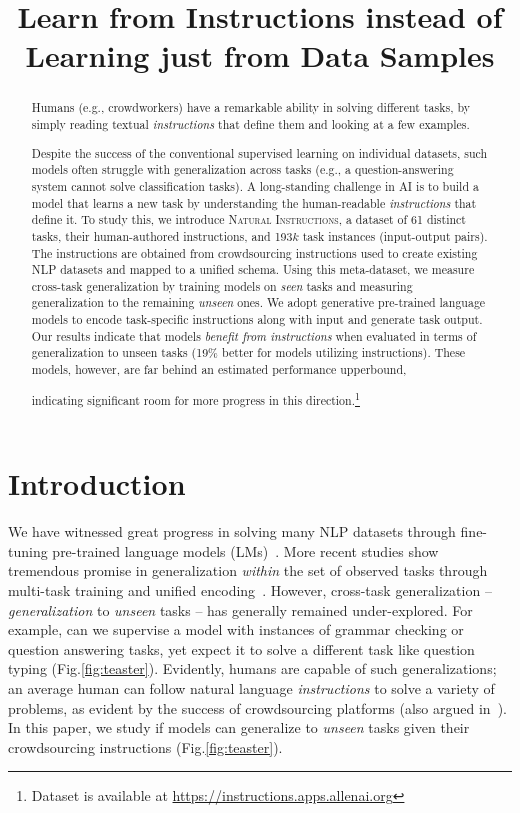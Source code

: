 \title{Learn from Instructions instead of Learning just from Data Samples}

\begin{abstract}
Humans (e.g., crowdworkers) have a remarkable ability in solving different tasks, by simply reading textual \emph{instructions} that define them and looking at a few examples. 

{Despite the success of the conventional supervised learning on individual datasets, such models} often struggle with generalization across tasks (e.g., a question-answering system cannot solve  classification tasks). A long-standing challenge in AI is to build a model that learns a new task by understanding the human-readable \emph{instructions} that define it. To study this, we introduce \textsc{Natural Instructions},  a dataset of 61  distinct tasks, their human-authored instructions, and 193$k$ task instances {(input-output pairs)}. The instructions are obtained from crowdsourcing instructions used to create  existing NLP datasets and  mapped to a unified schema. Using this meta-dataset, we measure cross-task generalization by training models on {\emph{\color{blue} seen}}  tasks and measuring generalization to the remaining {\emph{\color{red} unseen}} ones. We adopt generative pre-trained language models to encode task-specific instructions along with input and generate task output. Our results indicate that models \emph{benefit from instructions} when evaluated in terms of generalization to unseen tasks {(19\% better for models utilizing instructions)}. These models, however, are far behind {an estimated performance upperbound,}

 indicating significant room for more progress in this direction.\footnote{

Dataset is available at {\color{orange}\url{https://instructions.apps.allenai.org}}
}
\end{abstract}

\section{Introduction}

We have witnessed great progress in solving many NLP datasets through fine-tuning pre-trained language models (LMs)~\cite{peters2018deep,brown2020language}. More recent studies show tremendous promise in  generalization \emph{within} the set of observed tasks through multi-task training and unified encoding~\cite{khashabi2020unifiedqa,aghajanyan2021muppet}. However, cross-task generalization -- \emph{generalization} to  \emph{unseen} tasks -- has generally remained under-explored. For example, can we supervise a model with instances of grammar checking or question answering tasks, yet expect it to solve a different task like question typing (Fig.\ref{fig:teaster}).
Evidently, humans are capable of such generalizations; an average human can follow natural language \emph{instructions} to solve a variety of problems, as evident by the success of crowdsourcing platforms (also argued in~\citet{efrat2020turking}). In this paper, we study if models can generalize to  \emph{unseen} tasks given their crowdsourcing instructions (Fig.\ref{fig:teaster}). 

